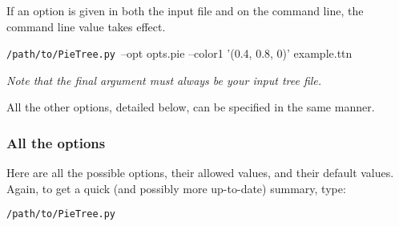 \documentclass[10pt]{article}
\newcommand{\PTpath}{\texttt{/path/to/PieTree.py}\xspace}
\begin{document}
If an option is given in both the input file and on the command line, the command line value takes effect.
\begin{commandis}
	\PTpath \ --opt opts.pie --color1 '(0.4, 0.8, 0)' example.ttn
\end{commandis}

{\em Note that the final argument must always be your input tree file.}

All the other options, detailed below, can be specified in the same manner.


\subsubsection*{All the options}

Here are all the possible options, their allowed values, and their default values.
Again, to get a quick (and possibly more up-to-date) summary, type:
\begin{commandis}
	\PTpath
\end{commandis}
\end{document}
